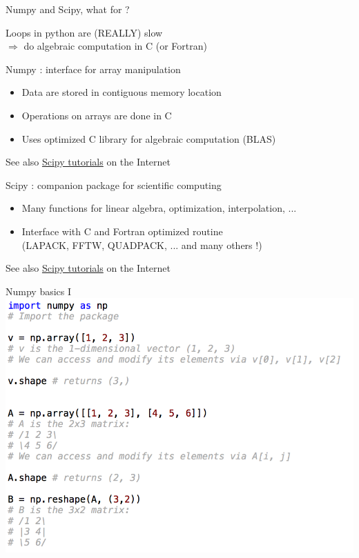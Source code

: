 \documentclass[11pt,unknownkeysallowed,usenames,dvipsnames]{beamer}
\begin{document}
\begin{frame}{Numpy and Scipy, what for ?}
	\begin{center}
        Loops in python are (REALLY) slow\\
        $\Rightarrow$ do algebraic computation in C (or Fortran)
    \end{center}
    \begin{block}{Numpy : interface for array manipulation}
        \begin{itemize}
            \item Data are stored in contiguous memory location
            \item Operations on arrays are done in C
            \item Uses optimized C library for algebraic computation (BLAS)
        \end{itemize}
    \end{block}See also \href{https://docs.scipy.org/doc/scipy/reference/tutorial/}{Scipy tutorials} on the Internet
    \begin{block}{Scipy : companion package for scientific computing}
        \begin{itemize}
            \item Many functions for linear algebra, optimization, interpolation, ...
            \item Interface with C and Fortran optimized routine\\
            (LAPACK, FFTW, QUADPACK, ... and many others !)
        \end{itemize}
    \end{block}
    \vspace*{-10pt}
    See also \href{https://docs.scipy.org/doc/scipy/reference/tutorial/}{Scipy tutorials} on the Internet
\end{frame}

\begin{frame}{Numpy basics I}
\includegraphics[width=0.9\linewidth]{code-numpy1}
\end{frame}
\end{document}
